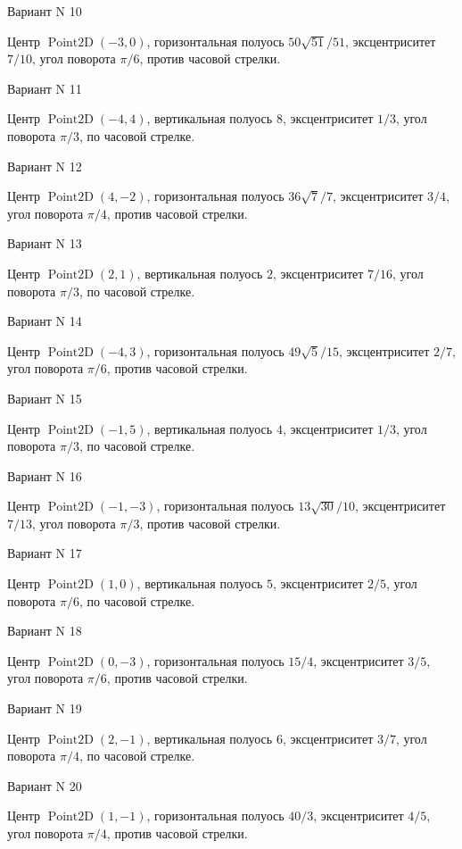 \documentclass[11pt]{report}
\begin{document}
Вариант N 10

Центр $\operatorname{Point2D}\left(-3, 0\right)$, горизонтальная полуось $50 \sqrt{51} / 51$, эксцентриситет $7 / 10$, угол поворота $\pi / 6$, против часовой стрелки.

Вариант N 11

Центр $\operatorname{Point2D}\left(-4, 4\right)$, вертикальная полуось $8$, эксцентриситет $1 / 3$, угол поворота $\pi / 3$, по часовой стрелке.

Вариант N 12

Центр $\operatorname{Point2D}\left(4, -2\right)$, горизонтальная полуось $36 \sqrt{7} / 7$, эксцентриситет $3 / 4$, угол поворота $\pi / 4$, против часовой стрелки.

Вариант N 13

Центр $\operatorname{Point2D}\left(2, 1\right)$, вертикальная полуось $2$, эксцентриситет $7 / 16$, угол поворота $\pi / 3$, по часовой стрелке.

Вариант N 14

Центр $\operatorname{Point2D}\left(-4, 3\right)$, горизонтальная полуось $49 \sqrt{5} / 15$, эксцентриситет $2 / 7$, угол поворота $\pi / 6$, против часовой стрелки.

Вариант N 15

Центр $\operatorname{Point2D}\left(-1, 5\right)$, вертикальная полуось $4$, эксцентриситет $1 / 3$, угол поворота $\pi / 3$, по часовой стрелке.

Вариант N 16

Центр $\operatorname{Point2D}\left(-1, -3\right)$, горизонтальная полуось $13 \sqrt{30} / 10$, эксцентриситет $7 / 13$, угол поворота $\pi / 3$, против часовой стрелки.

Вариант N 17

Центр $\operatorname{Point2D}\left(1, 0\right)$, вертикальная полуось $5$, эксцентриситет $2 / 5$, угол поворота $\pi / 6$, по часовой стрелке.

Вариант N 18

Центр $\operatorname{Point2D}\left(0, -3\right)$, горизонтальная полуось $15 / 4$, эксцентриситет $3 / 5$, угол поворота $\pi / 6$, против часовой стрелки.

Вариант N 19

Центр $\operatorname{Point2D}\left(2, -1\right)$, вертикальная полуось $6$, эксцентриситет $3 / 7$, угол поворота $\pi / 4$, по часовой стрелке.

Вариант N 20

Центр $\operatorname{Point2D}\left(1, -1\right)$, горизонтальная полуось $40 / 3$, эксцентриситет $4 / 5$, угол поворота $\pi / 4$, против часовой стрелки.
\end{document}
